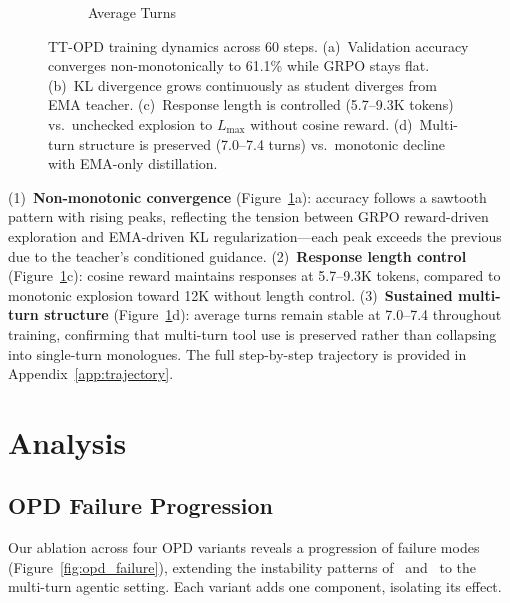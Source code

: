 \documentclass{article}
\begin{document}
\begin{figure}[t]
\begin{subfigure}[b]{0.48\textwidth}
\caption{Average Turns}
\end{subfigure}
\caption{TT-OPD training dynamics across 60 steps. (a)~Validation accuracy converges non-monotonically to 61.1\% while GRPO stays flat. (b)~KL divergence grows continuously as student diverges from EMA teacher. (c)~Response length is controlled (5.7--9.3K tokens) vs.\ unchecked explosion to $L_{\max}$ without cosine reward. (d)~Multi-turn structure is preserved (7.0--7.4 turns) vs.\ monotonic decline with EMA-only distillation.}
\label{fig:opd_trajectory}
\end{figure}

(1)~\textbf{Non-monotonic convergence} (Figure~\ref{fig:opd_trajectory}a): accuracy follows a sawtooth pattern with rising peaks, reflecting the tension between GRPO reward-driven exploration and EMA-driven KL regularization---each peak exceeds the previous due to the teacher's conditioned guidance. (2)~\textbf{Response length control} (Figure~\ref{fig:opd_trajectory}c): cosine reward maintains responses at 5.7--9.3K tokens, compared to monotonic explosion toward 12K without length control. (3)~\textbf{Sustained multi-turn structure} (Figure~\ref{fig:opd_trajectory}d): average turns remain stable at 7.0--7.4 throughout training, confirming that multi-turn tool use is preserved rather than collapsing into single-turn monologues. The full step-by-step trajectory is provided in Appendix~\ref{app:trajectory}.


\section{Analysis}
\label{sec:analysis}

\subsection{OPD Failure Progression}
\label{sec:opd_instability}

Our ablation across four OPD variants reveals a progression of failure modes (Figure~\ref{fig:opd_failure}), extending the instability patterns of~\citet{yang26rlsd} and~\citet{zhao26opsd} to the multi-turn agentic setting. Each variant adds one component, isolating its effect.
\end{document}
